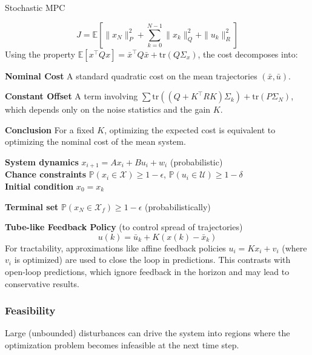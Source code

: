 \begin{sstTitleBox}{
    Stochastic MPC
  }
  \begin{sstOnlyFrame}
    \[J = \mathbb{E} \left[ \|x_N\|_P^2 + \sum_{k=0}^{N-1}
    \|x_k\|_Q^2 + \|u_k\|_R^2 \right]\]
    Using the property $\mathbb{E}[x^\top Q x] = \bar{x}^\top Q
    \bar{x} + \text{tr}(Q \Sigma_x)$, the cost decomposes into:

    \textbf{Nominal Cost}
    A standard quadratic cost on the mean
    trajectories $(\bar{x}, \bar{u})$.

    \textbf{Constant Offset}
    A term involving $\sum \text{tr}((Q + K^\top R K) \Sigma_k) +
    \text{tr}(P \Sigma_N)$,
    which depends only on the noise statistics and the gain $K$.

    \textbf{Conclusion}
    For a fixed $K$, optimizing the expected cost is equivalent
    to optimizing the nominal cost of the mean system.
  \end{sstOnlyFrame}
  \begin{sstOnlyFrame}
    \textbf{System dynamics}
    $x_{i+1} = A x_i + B u_i + w_i$ (probabilistic)\\

    \textbf{Chance constraints}
    $\mathbb{P}(x_i \in \mathcal{X}) \geq 1 - \epsilon$,
    $\mathbb{P}(u_i \in \mathcal{U}) \geq 1 - \delta$\\

    \textbf{Initial condition}
    $x_0 = x_k$

    \textbf{Terminal set}
    $\mathbb{P}(x_N \in \mathcal{X}_f) \geq 1 - \epsilon$ (probabilistically)
  \end{sstOnlyFrame}
  \begin{sstOnlyFrame}
    \textbf{Tube-like Feedback Policy}
    (to control spread of trajectories)
    \[u(k) = \bar{u}_k + K(x(k) - \bar{x}_k)\]
    For tractability, approximations like affine feedback policies $u_i =
    K x_i + v_i$ (where $v_i$ is optimized) are used to close the loop in
    predictions. This contrasts with open-loop predictions, which
    ignore feedback in the horizon and may lead to conservative results.
  \end{sstOnlyFrame}
\end{sstTitleBox}

\subsubsection{Feasibility}
Large (unbounded) disturbances can drive the system into regions
where the optimization problem becomes infeasible at the next time step.

